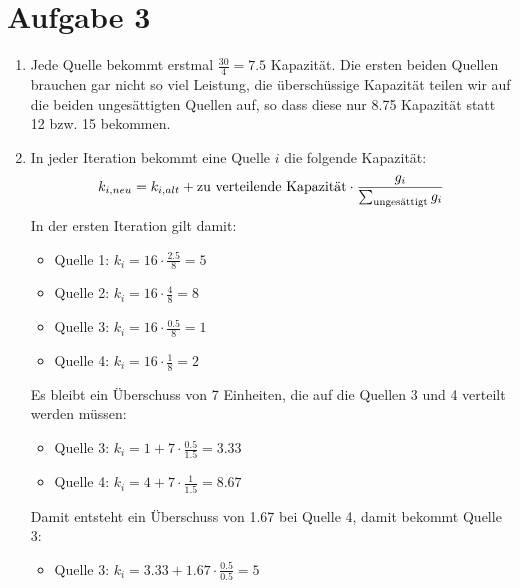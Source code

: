 \documentclass{article}
\begin{document}
	\section*{Aufgabe 3}
	\begin{enumerate}[label=(\alph*)]
		\item Jede Quelle bekommt erstmal $\frac{30}{4}=7.5$ Kapazität. Die ersten beiden Quellen brauchen gar nicht so viel Leistung, die überschüssige Kapazität teilen wir auf die beiden ungesättigten Quellen auf, so dass diese nur 8.75 Kapazität statt 12 bzw. 15 bekommen.
		\item In jeder Iteration bekommt eine Quelle $i$ die folgende Kapazität:
		\begin{align}
			k_{i,neu} = k_{i,alt} + \text{zu verteilende Kapazität} \cdot \frac{g_i}{\sum_{\text{ungesättigt}} g_i} \notag
		\end{align}
		In der ersten Iteration gilt damit:
		\begin{itemize}
			\item Quelle 1: $k_i=16\cdot\frac{2.5}{8}=5$
			\item Quelle 2: $k_i=16\cdot\frac{4}{8}=8$
			\item Quelle 3: $k_i=16\cdot\frac{0.5}{8}=1$
			\item Quelle 4: $k_i=16\cdot\frac{1}{8}=2$
		\end{itemize}
		Es bleibt ein Überschuss von 7 Einheiten, die auf die Quellen 3 und 4 verteilt werden müssen:
		\begin{itemize}
			\item Quelle 3: $k_i=1+7\cdot\frac{0.5}{1.5}=3.33$
			\item Quelle 4: $k_i=4+7\cdot\frac{1}{1.5}=8.67$
		\end{itemize}
		Damit entsteht ein Überschuss von 1.67 bei Quelle 4, damit bekommt Quelle 3:
		\begin{itemize}
			\item Quelle 3: $k_i=3.33+1.67\cdot\frac{0.5}{0.5}=5$ 
		\end{itemize}
	\end{enumerate}
\end{document}
